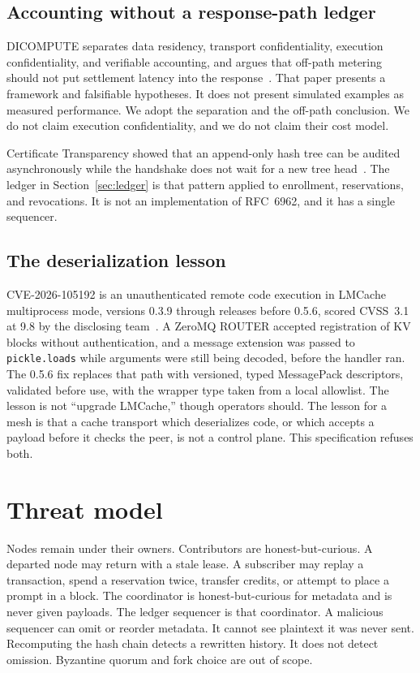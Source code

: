 \documentclass[11pt]{article}
\begin{document}
\subsection{Accounting without a response-path ledger}
DICOMPUTE separates data residency, transport confidentiality, execution confidentiality, and verifiable accounting, and argues that off-path metering should not put settlement latency into the response~\cite{dicompute}. That paper presents a framework and falsifiable hypotheses. It does not present simulated examples as measured performance. We adopt the separation and the off-path conclusion. We do not claim execution confidentiality, and we do not claim their cost model.

Certificate Transparency showed that an append-only hash tree can be audited asynchronously while the handshake does not wait for a new tree head~\cite{ct}. The ledger in Section~\ref{sec:ledger} is that pattern applied to enrollment, reservations, and revocations. It is not an implementation of RFC~6962, and it has a single sequencer.

\subsection{The deserialization lesson}
CVE-2026-105192 is an unauthenticated remote code execution in LMCache multiprocess mode, versions 0.3.9 through releases before 0.5.6, scored CVSS~3.1 at 9.8 by the disclosing team~\cite{cve}. A ZeroMQ ROUTER accepted registration of KV blocks without authentication, and a message extension was passed to \texttt{pickle.loads} while arguments were still being decoded, before the handler ran. The 0.5.6 fix replaces that path with versioned, typed MessagePack descriptors, validated before use, with the wrapper type taken from a local allowlist. The lesson is not ``upgrade LMCache,'' though operators should. The lesson for a mesh is that a cache transport which deserializes code, or which accepts a payload before it checks the peer, is not a control plane. This specification refuses both.

\section{Threat model}
Nodes remain under their owners. Contributors are honest-but-curious. A departed node may return with a stale lease. A subscriber may replay a transaction, spend a reservation twice, transfer credits, or attempt to place a prompt in a block. The coordinator is honest-but-curious for metadata and is never given payloads. The ledger sequencer is that coordinator. A malicious sequencer can omit or reorder metadata. It cannot see plaintext it was never sent. Recomputing the hash chain detects a rewritten history. It does not detect omission. Byzantine quorum and fork choice are out of scope.
\end{document}
